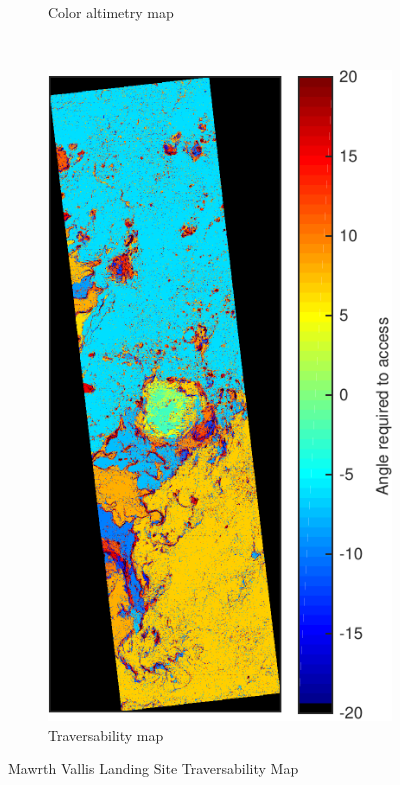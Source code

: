 \documentclass[12pt]{article}
\begin{document}
\begin{figure}[h!]
\begin{subfigure}[t]{0.35\textwidth}
    \caption{Color altimetry map}
    \label{fig:eberswalde_dtm}
  \end{subfigure}
  ~
  \begin{subfigure}[t]{0.35\textwidth}
    \centering
    \includegraphics[height=0.4\paperheight]{figures/maps/ESP_019757_1560/DTEEC_019757_1560_020034_1560_U01-traversability_map.pdf}
    \caption{Traversability map}
    \label{fig:eberswalde_traversability}
  \end{subfigure}
  \caption{Mawrth Vallis Landing Site Traversability Map}
  \label{fig:eberswalde}
\end{figure}
\end{document}
